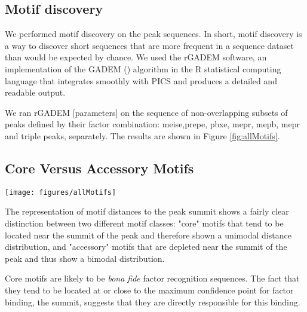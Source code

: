 \subsection{Motif discovery}

We performed motif discovery on the peak sequences. In short, motif discovery is a way to discover short sequences that are more frequent in a sequence dataset than would be expected by chance. We used the rGADEM software, an implementation of the GADEM (\cite{Li2009a}) algorithm in the R statistical computing language that integrates smoothly with \ac{PICS} and produces a detailed and readable output.

We ran rGADEM [parameters] on the sequence of non-overlapping subsets of peaks defined by their factor combination: \ac{meise},\ac{prepe}, \ac{pbxe}, \ac{mepr}, \ac{mepb}, \ac{mepr} and triple peaks, separately. The results are shown in Figure \ref{fig:allMotifs}.

\subsection{Core Versus Accessory Motifs}

\begin{SCfigure}[]
    \centering
  \texttt{[image: figures/allMotifs]}
  \caption[All Motifs Found in Peak subsets]{\textbf{All Motifs Found in Peak subsets.} Sequence logos for every motif found in each non-overlapping peak subset. "Core" motifs labelled in red. The logos resulting from the motif definitions (\acp{PSSM}) which we selected as canonical and used for directed motif search are highlighted in grey. The histograms to the right of the sequence logo show the distribution of motif positions with respect to the summit of the peak.}
  \label{fig:allMotifs}
\end{SCfigure}

The representation of motif distances to the peak summit shows a fairly clear distinction between two different motif classes: "core" motifs that tend to be located near the summit of the peak and therefore shown a unimodal distance distribution, and "accessory" motifs that are depleted near the summit of the peak and thus show a bimodal distribution. 

Core motifs are likely to be \textit{bona fide} factor recognition sequences. The fact that they tend to be located at or close to the maximum confidence point for factor binding, the summit, suggests that they are directly responsible for this binding.

